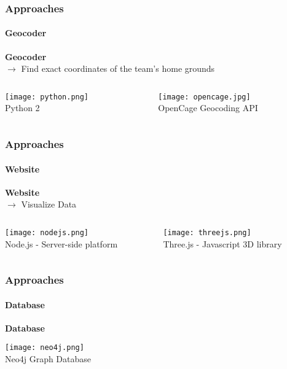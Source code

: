 \documentclass{beamer}
\begin{document}
	 \begin{frame}
    \frametitle{Approaches}
		\framesubtitle{Geocoder}
		\textbf{Geocoder} \\
		$\rightarrow$ Find exact coordinates of the team's home grounds
    \begin{columns}[T] %
     \begin{column}[T]{5cm} %
			\begin{center}
     \texttt{[image: python.png]}\\
			Python 2
			\end{center}
     \end{column}
     \begin{column}[T]{5cm} %
		\begin{center}
		 \texttt{[image: opencage.jpg]} \\
			OpenCage Geocoding API
			\end{center}
     \end{column}
     \end{columns}
  \end{frame}
	
	 \begin{frame}
    \frametitle{Approaches}
		\framesubtitle{Website}
		\textbf{Website} \\
		$\rightarrow$ Visualize Data
    \begin{columns}[T] %
     \begin{column}[T]{5cm} %
			\begin{center}
     \texttt{[image: nodejs.png]}\\
			Node.js - Server-side platform
			\end{center}
     \end{column}
     \begin{column}[T]{5cm} %
		\begin{center}
		 \texttt{[image: threejs.png]} \\
			Three.js - Javascript 3D library
			\end{center}
     \end{column}
     \end{columns}
  \end{frame}
	
	\begin{frame}
		\frametitle{Approaches}
		\framesubtitle{Database}
		\textbf{Database} \\ 
			\begin{center}
      \texttt{[image: neo4j.png]}\\
			Neo4j Graph Database
			\end{center}
  \end{frame}
	
\end{document}
